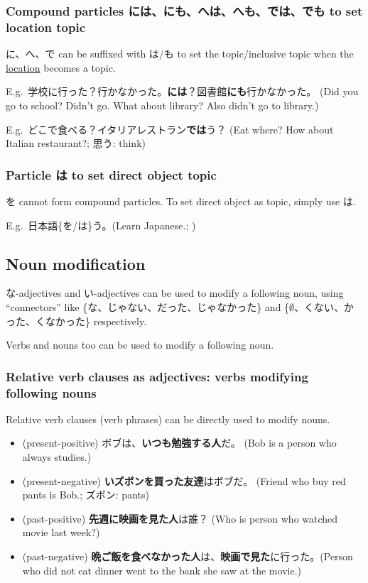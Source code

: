 \documentclass[../nihongo-gakushuu-kyouzai.tex]{subfiles}
\begin{document}
\subsubsection{Compound particles には、にも、へは、へも、では、でも to set location topic}
に、へ、で can be suffixed with は/も to set the topic/inclusive topic when the \ul{location} becomes a topic.

E.g.\ 学校に行った？行かなかった。\textbf{には}？図書館\textbf{にも}行かなかった。 (Did you go to school? Didn't go. What about library? Also didn't go to library.)

E.g.\ どこで食べる？イタリアレストラン\textbf{では}う？ (Eat where? How about Italian restaurant?; 思う: think)

\subsubsection{Particle は to set direct object topic}
を cannot form compound particles. To set direct object as topic, simply use は.

E.g.\ 日本語\{を/は\}う。(Learn Japanese.; )

\subsection{Noun modification}
な-adjectives and い-adjectives can be used to modify a following noun, using ``connectors'' like \{な、じゃない、だった、じゃなかった\} and \{$\emptyset$、くない、かった、くなかった\} respectively.

Verbs and nouns too can be used to modify a following noun.

\subsubsection{Relative verb clauses as adjectives: verbs modifying following nouns} \label{sec:relative-verb-clauses-as-adjectives}
Relative verb clauses (verb phrases) can be directly used to modify nouns.
\begin{itemize}
    \item (present-positive) ボブは、\textbf{いつも勉強する人}だ。 (Bob is a person who always studies.)
    \item (present-negative) \textbf{いズボンを買った友達}はボブだ。 (Friend who buy red pants is Bob.; ズボン: pants)
    \item (past-positive) \textbf{先週に映画を見た人}は誰？ (Who is person who watched movie last week?)
    \item (past-negative) \textbf{晩ご飯を食べなかった人}は、\textbf{映画で見た}に行った。(Person who did not eat dinner went to the bank she saw at the movie.)
\end{itemize}
\end{document}
